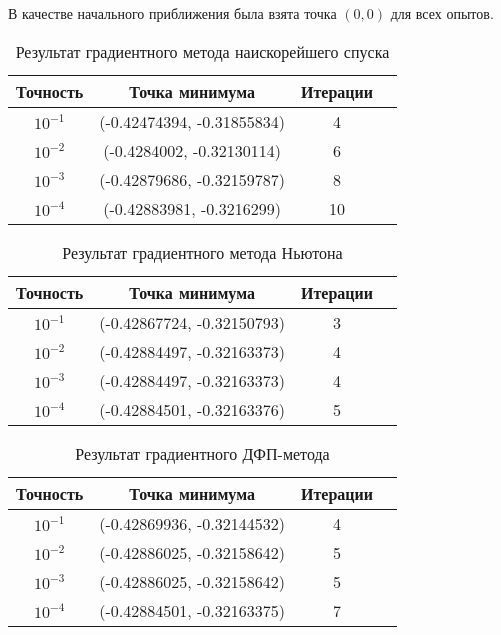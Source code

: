 \documentclass[../body.tex]{subfiles}
\begin{document}
В качестве начального приближения была взята точка $(0,0)$ для всех опытов.
\begin{table}[H]
    \centering
    \begin{tabular}{|c|c|c|c|}
        \hline
        Точность & Точка минимума & Итерации\\\hline
        $10^{-1}$ & (-0.42474394, -0.31855834) & 4\\\hline
        $10^{-2}$ & (-0.4284002, -0.32130114) & 6\\\hline
        $10^{-3}$ & (-0.42879686, -0.32159787) & 8\\\hline
        $10^{-4}$ & (-0.42883981, -0.3216299) & 10\\\hline
    \end{tabular}
    \caption{Результат градиентного метода наискорейшего спуска}
\end{table}

\begin{table}[H]
    \centering
    \begin{tabular}{|c|c|c|c|}
        \hline
        Точность & Точка минимума & Итерации\\\hline
        $10^{-1}$ & (-0.42867724, -0.32150793) & 3\\\hline
        $10^{-2}$ & (-0.42884497, -0.32163373) & 4\\\hline
        $10^{-3}$ & (-0.42884497, -0.32163373) & 4\\\hline
        $10^{-4}$ & (-0.42884501, -0.32163376) & 5\\\hline
    \end{tabular}
    \caption{Результат градиентного метода Ньютона}
\end{table}

\begin{table}[H]
    \centering
    \begin{tabular}{|c|c|c|c|}
        \hline
        Точность & Точка минимума & Итерации\\\hline
        $10^{-1}$ & (-0.42869936, -0.32144532) & 4\\\hline
        $10^{-2}$ & (-0.42886025, -0.32158642) & 5\\\hline
        $10^{-3}$ & (-0.42886025, -0.32158642) & 5\\\hline
        $10^{-4}$ & (-0.42884501, -0.32163375) & 7\\\hline
    \end{tabular}
    \caption{Результат градиентного ДФП-метода}
\end{table}
\end{document}
